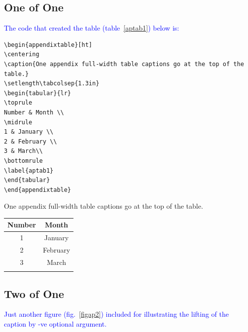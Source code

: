\documentclass[phd]{ndsu-thesis-2022}
\newcommand\italk[1]{\textcolor{blue}{#1}}  %
\begin{document}

\subsection{One of One}
\label{sub1}
\kant[2]

\italk{The code that created the table (table~\ref{aptab1}) below is:}

{\onehalfspacing
\begin{verbatim}
\begin{appendixtable}[ht]
\centering
\caption{One appendix full-width table captions go at the top of the table.}
\setlength\tabcolsep{1.3in}
\begin{tabular}{lr}
\toprule
Number & Month \\
\midrule
1 & January \\
2 & February \\
3 & March\\
\bottomrule
\label{aptab1}
\end{tabular}
\end{appendixtable}
\end{verbatim}
}

\begin{appendixtable}[ht]
\centering
\caption{One appendix full-width table captions go at the top of the table.}
\setlength\tabcolsep{1.3in}
\begin{tabular}{cc}
\toprule
Number & Month \\
\midrule
1 & January \\
2 & February \\
3 & March\\
\bottomrule
\label{aptab1}
\end{tabular}
\end{appendixtable}

\subsection{Two of One}

\italk{Just another figure (fig.~\ref{figap2}) included for illustrating the lifting of the caption by -ve optional argument. }

\end{document}
